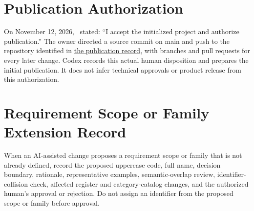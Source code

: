 \section{Publication Authorization}
\label{Section:PublicationAuthorization}
On November 12, 2026, \DocumentOwner\ stated: ``I accept the initialized
project and authorize publication.'' The owner directed a source commit on
main and push to the repository identified in
\hyperref[Section:InitializationPublication]{the publication record}, with
branches and pull requests for every later change. Codex records this actual
human disposition and prepares the initial publication. It does not infer
technical approvals or product release from this authorization.

\section{Requirement Scope or Family Extension Record}
When an AI-assisted change proposes a requirement scope or family that is not
already defined, record the proposed uppercase code, full name, decision
boundary, rationale, representative examples, semantic-overlap review,
identifier-collision check, affected register and category-catalog changes, and
the authorized human's approval or rejection. Do not assign an identifier from
the proposed scope or family before approval.

